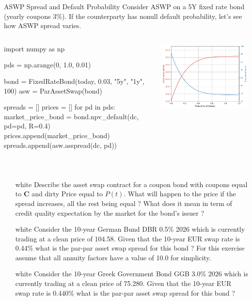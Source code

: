 \documentclass{beamer}
\begin{document}
\begin{frame}[fragile]{ASWP Spread and Default Probability}
Consider ASWP on a 5Y fixed rate bond (yearly coupons 3\%). If the counterparty has nonull default probability, let's see how ASWP spread varies.

\begin{columns}
\begin{ipython}
import numpy as np

pds = np.arange(0, 1.0, 0.01)

bond = FixedRateBond(today, 0.03, "5y", "1y", 100)
asw = ParAssetSwap(bond)

spreads = []
prices = []
for pd in pds:
  market_price_bond = bond.npv_default(dc, pd=pd, R=0.4)
  prices.append(market_price_bond)
  spreads.append(asw.asspread(dc, pd))    
\end{ipython}
\includegraphics[width=0.9\linewidth]{images/aswp_spread}
\end{columns}

\end{frame}

\begin{homework}
\begin{frame}{\textcolor{white}{Homework}}
\begin{itemize}
\item[white] Describe the asset swap contract for a coupon bond with coupons equal to \textbf{C} and dirty Price equal to $P(t)$. What will happen to the price if the spread increases, all the rest being equal ? What does it mean in term of credit quality expectation by the market for the bond's issuer ?
\item[white]  Consider the 10-year German Bund DBR 0.5\% 2026 which is currently trading at a clean price of 104.58. 
Given that the 10-year EUR swap rate is 0.44\% what is the par-par asset swap spread for this bond ? 
For this exercise assume that all annuity factors have a value of 10.0 for simplicity.
\item[white] Consider the 10-year Greek Government Bond GGB 3.0\% 2026 which is currently trading at a clean price of 75.280. Given that the 10-year EUR swap rate is 0.440\% what is the par-par asset swap spread for this bond ?
\end{itemize}
\end{frame}
\end{homework}
\end{document}
